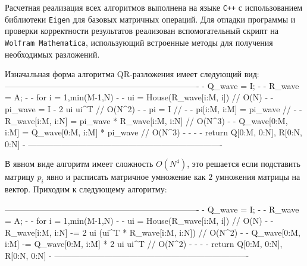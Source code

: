 \documentclass[a4paper,14pt]{extarticle}
\newenvironment{smallverbatim}%
{\small\verbatim}%
{\endverbatim}
\begin{document}
Расчетная реализация всех алгоритмов выполнена на языке \texttt{C++} с использованием библиотеки \texttt{Eigen} для базовых матричных операций. Для отладки программы и проверки корректности результатов реализован вспомогательный скрипт на \texttt{Wolfram Mathematica}, использующий встроенные методы для получения необходимых разложений.

Изначальная форма алгоритма QR-разложения имеет следующий вид:
\begin{smallverbatim}
----------------------------------------------------------------------
-   Q_wave = I;                                                      -
-   R_wave = A;                                                      -
-   for i = 1,min(M-1,N) {                                           -
-      ui                = House(R_wave[i:M, i])      // O(N)        -
-      pi_wave           = I - 2 ui ui^T              // O(N^2)      -
-      pi                = I                          //             -
-      pi[i:M, i:M]      = pi_wave                    //             -
-      R_wave[i:M, i:N]  = pi_wave * R_wave[i:M, i:N] // O(N^3)      -
-      Q_wave[0:M, i:M]  = Q_wave[0:M, i:M] * pi_wave // O(N^3)      -
-   }                                                                -
-   return { Q[0:M, 0:N], R[0:N, 0:N] }                              - 
----------------------------------------------------------------------
\end{smallverbatim}

В явном виде алгоритм имеет сложность $O(N^4)$, это решается если подставить матрицу $p_i$ явно и расписать матричное умножение как $2$ умножения матрицы на вектор. Приходим к следующему алгоритму:

\begin{smallverbatim}
----------------------------------------------------------------------
-   Q_wave = I;                                                      -
-   R_wave = A;                                                      -
-   for i = 1,min(M-1,N) {                                           -
-      ui                = House(R_wave[i:M, i])          // O(N)    -
-      R_wave[i:M, i:N] -= 2 ui (ui^T * R_wave[i:M, i:N]) // O(N^2)  -
-      Q_wave[0:M, i:M]  -= Q_wave[0:M, i:M] * 2 ui ui^T  // O(N^2)  -
-   }                                                                -
-   return { Q[0:M, 0:N], R[0:N, 0:N] }                              -
----------------------------------------------------------------------
\end{smallverbatim}
\end{document}
